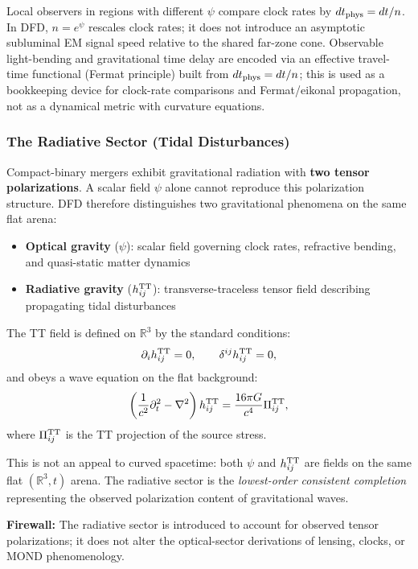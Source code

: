 Local observers in regions with different $\psi$ compare clock rates by $dt_{\rm phys} = dt/n$. In DFD, $n = e^\psi$ rescales clock rates; it does not introduce an asymptotic subluminal EM signal speed relative to the shared far-zone cone. Observable light-bending and gravitational time delay are encoded via an effective travel-time functional (Fermat principle) built from $dt_{\rm phys} = dt/n$; this is used as a bookkeeping device for clock-rate comparisons and Fermat/eikonal propagation, not as a dynamical metric with curvature equations.

\subsubsection{The Radiative Sector (Tidal Disturbances)}

Compact-binary mergers exhibit gravitational radiation with \textbf{two tensor polarizations}. A scalar field $\psi$ alone cannot reproduce this polarization structure. DFD therefore distinguishes two gravitational phenomena on the same flat arena:
\begin{itemize}
\item \textbf{Optical gravity} ($\psi$): scalar field governing clock rates, refractive bending, and quasi-static matter dynamics
\item \textbf{Radiative gravity} ($h_{ij}^{\rm TT}$): transverse-traceless tensor field describing propagating tidal disturbances
\end{itemize}

The TT field is defined on $\mathbb{R}^3$ by the standard conditions:
\begin{equation}
\partial_i h_{ij}^{\rm TT} = 0, \qquad \delta^{ij}h_{ij}^{\rm TT} = 0,
\end{equation}
and obeys a wave equation on the flat background:
\begin{equation}\label{eq:TT-wave-eq}
\left(\frac{1}{c^2}\partial_t^2 - \nabla^2\right)h_{ij}^{\rm TT} = \frac{16\pi G}{c^4}\Pi_{ij}^{\rm TT},
\end{equation}
where $\Pi_{ij}^{\rm TT}$ is the TT projection of the source stress.

This is not an appeal to curved spacetime: both $\psi$ and $h_{ij}^{\rm TT}$ are fields on the same flat $(\mathbb{R}^3, t)$ arena. The radiative sector is the \textit{lowest-order consistent completion} representing the observed polarization content of gravitational waves.

\textbf{Firewall:} The radiative sector is introduced to account for observed tensor polarizations; it does not alter the optical-sector derivations of lensing, clocks, or MOND phenomenology.

